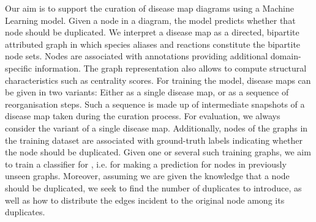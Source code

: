 \documentclass[
	fontsize=10pt, %
	twoside=false, %
	secnumdepth=1, %
  toc=indentunnumbered %
]{kaobook}
\begin{document}
Our aim is to support the curation of disease map diagrams using a Machine
Learning model. Given a node in a diagram, the model predicts whether that node
should be duplicated.
%
We interpret a disease map as a directed, bipartite attributed graph in which
species aliases and reactions constitute the bipartite node sets. Nodes are
associated with annotations providing additional domain-specific information.
The graph representation also allows to compute structural characteristics such
as centrality scores.
%
For training the model, disease maps can be given in two variants: Either as a
single disease map, or as a sequence of reorganisation steps. Such a sequence is
made up of intermediate snapshots of a disease map taken during the curation
process. For evaluation, we always consider the variant of a single disease map.
%
Additionally, nodes of the graphs in the training dataset are associated with
ground-truth labels indicating whether the node should be duplicated. Given one
or several such training graphs, we aim to train a classifier for , i.e. for making a prediction for nodes in previously
unseen graphs.
%
Moreover, assuming we are given the knowledge that a node should be duplicated,
we seek to find the number of duplicates to introduce, as well as how to
distribute the edges incident to the original node among its duplicates.


\end{document}
